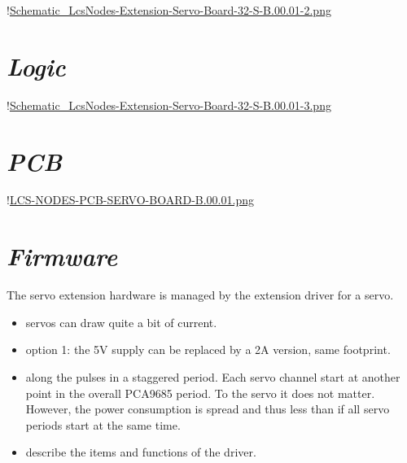 !\href{./Schematics/Schematic_LcsNodes-Extension-Servo-Board-32-S-B.00.01-2.png }{Schematic_LcsNodes-Extension-Servo-Board-32-S-B.00.01-2.png}

\section{\textit{Logic}}

!\href{./Schematics/Schematic_LcsNodes-Extension-Servo-Board-32-S-B.00.01-3.png }{Schematic_LcsNodes-Extension-Servo-Board-32-S-B.00.01-3.png}

\section{\textit{PCB}}

!\href{./Schematics/LCS-NODES-PCB-SERVO-BOARD-B.00.01.png }{LCS-NODES-PCB-SERVO-BOARD-B.00.01.png}

\section{\textit{Firmware}}

The servo extension hardware is managed by the extension driver for a servo.
\begin{itemize}
\item servos can draw quite a bit of current.
\item option 1: the 5V supply can be replaced by a 2A version, same footprint.
\item along the pulses in a staggered period. Each servo channel start at another point in the overall PCA9685 period. To the servo it does not matter. However, the power consumption is spread and thus less than if all servo periods start at the same time.
\item describe the items and functions of the driver.
\end{itemize}

